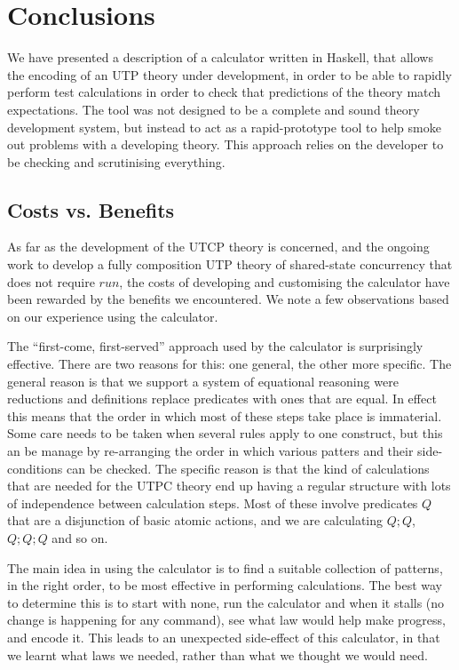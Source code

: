 \section{Conclusions}\label{sec:Conc}

We have presented a description of a calculator written in Haskell,
that allows the encoding of an UTP theory under development,
in order to be able to rapidly perform test calculations
in order to check that predictions of the theory match expectations.
The tool was not designed to be a complete and sound theory development
system,
but instead to act as a rapid-prototype tool to help smoke out problems
with a developing theory. This approach relies on the  developer
to be checking and scrutinising everything.

\subsection{Costs vs. Benefits}

As far as the development of the UTCP theory is concerned,
and the ongoing work to develop a fully composition UTP theory
of shared-state concurrency that does not require $run$,
the costs of developing and customising the calculator
have been rewarded by the benefits we encountered.
We note a few observations based on our experience
using the calculator.


   The ``first-come, first-served'' approach
   used by the calculator is surprisingly effective.
   There are two reasons for this: one general,
   the other more specific.
   The general reason is that we support a system of equational reasoning
   were reductions and definitions replace predicates with ones that
   are equal.
   In effect this means that the order in which most of these steps
   take place is immaterial.
   Some care needs to be taken when several rules apply to one construct,
   but this an be manage by re-arranging the order in which various
   patters and their side-conditions can be checked.
   The specific reason is that the kind of calculations
   that are needed for the UTPC theory
   end up having a regular structure with lots of independence between
   calculation steps. Most of these involve predicates $Q$ that are
   a disjunction of basic atomic actions,
   and we are calculating $Q;Q$, $Q;Q;Q$ and so on.


   The main idea in using the calculator
   is to find a suitable collection of patterns,
   in the right order,
   to be most effective in performing calculations.
   The best way to determine this is to start with none,
   run the calculator and when it stalls
   (no change is happening for any command),
   see what law would help make progress, and encode it.
   This leads to an unexpected side-effect of this calculator,
   in that we learnt what laws we needed,
   rather than what we thought we would need.

